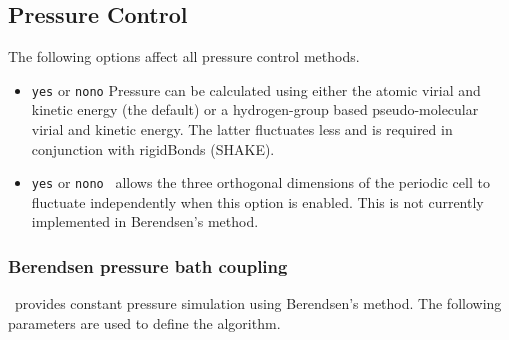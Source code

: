 \subsection{Pressure Control}

The following options affect all pressure control methods.

\begin{itemize}

\item
{}
{{\tt yes} or {\tt no}}{{\tt no}}
{Pressure can be calculated using either the atomic virial and kinetic
energy (the default) or a hydrogen-group based pseudo-molecular
virial and kinetic energy.  The latter fluctuates less and is
required in conjunction with rigidBonds (SHAKE).}

\item
{}
{{\tt yes} or {\tt no}}{{\tt no}}
{\NAMD\ allows the three orthogonal dimensions of the periodic cell
to fluctuate independently when this option is enabled.
This is not currently implemented in Berendsen's method.}

\end{itemize}

\subsubsection{Berendsen pressure bath coupling}

\NAMD\ provides constant pressure simulation using Berendsen's method.  
The following parameters are used to define the algorithm.  

